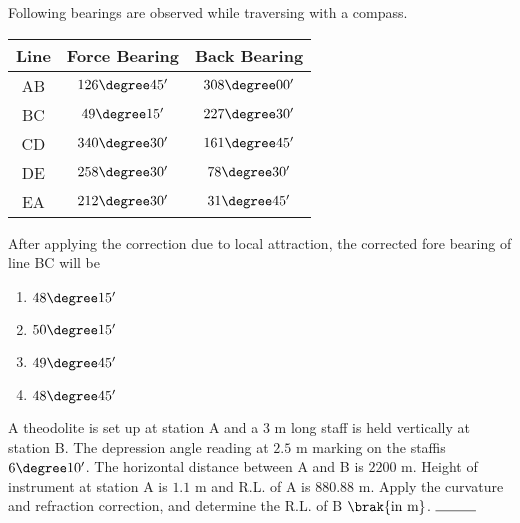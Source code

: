     \item Following bearings are observed while traversing with a compass.
	\hfill{}
	\begin{table}[h!]
		\centering
		\begin{tabular}[12pt]{ |c| c| c|}
			\hline
			Line & Force Bearing & Back Bearing\\
			\hline
			AB & $126\degree 45^{\prime}$ & $308\degree 00^{\prime}$\\
			\hline
			BC & $49\degree 15^{\prime}$ & $227\degree 30^{\prime}$\\
			\hline
			CD & $340\degree 30^{\prime}$ & $161\degree 45^{\prime}$\\
			\hline
			DE & $258\degree 30^{\prime}$ & $78\degree 30^{\prime}$\\
			\hline
			EA & $212\degree 30^{\prime}$ & $31\degree 45^{\prime}$\\
			\hline
		\end{tabular}
	\end{table}
	After applying the correction due to local attraction, the corrected fore bearing of line BC will be

	\begin{enumerate}
		\item $48\degree 15^{\prime}$
		\item $50\degree 15^{\prime}$
		\item $49\degree 45^{\prime}$
		\item $48\degree 45^{\prime}$
	\end{enumerate}

    \item A theodolite is set up at station A and a $3$ m long staff is held vertically at station B. The depression
angle reading at $2.5$ m marking on the staffis $6\degree 10^{\prime}$. The horizontal distance between A and B is
$2200$ m. Height of instrument at station A is $1.1$ m and R.L. of A is $880.88$ m. Apply the curvature
and refraction correction, and determine the R.L. of B $\brak{\text{in m}}$. $\rule{1cm}{0.15mm}$ 
	\hfill{}

